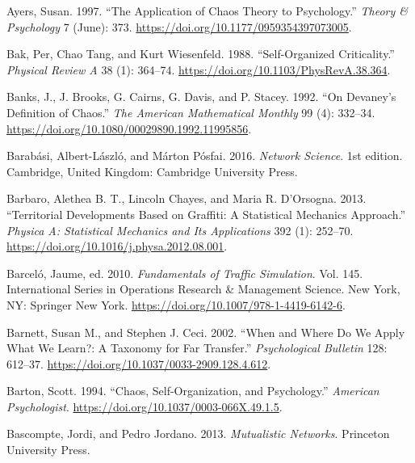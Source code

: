 \documentclass[
  a4paper,
  DIV=11,
  numbers=noendperiod]{scrreprt}
\newlength{\cslhangindent}
\newlength{\cslentryspacingunit} %
\newenvironment{CSLReferences}[2] %
 {%
  \setlength{\parindent}{0pt}
  \ifodd #1
  \let\oldpar\par
  \def\par{\hangindent=\cslhangindent\oldpar}
  \fi
  \setlength{\parskip}{#2\cslentryspacingunit}
 }%
 {}
\begin{document}
\begin{CSLReferences}{1}{0}
\leavevmode{}%
Ayers, Susan. 1997. {``The {Application} of {Chaos Theory} to
{Psychology}.''} \emph{Theory \& Psychology} 7 (June): 373.
\url{https://doi.org/10.1177/0959354397073005}.

\leavevmode{}%
Bak, Per, Chao Tang, and Kurt Wiesenfeld. 1988. {``Self-Organized
Criticality.''} \emph{Physical Review A} 38 (1): 364--74.
\url{https://doi.org/10.1103/PhysRevA.38.364}.

\leavevmode{}%
Banks, J., J. Brooks, G. Cairns, G. Davis, and P. Stacey. 1992. {``On
{Devaney}'s {Definition} of {Chaos}.''} \emph{The American Mathematical
Monthly} 99 (4): 332--34.
\url{https://doi.org/10.1080/00029890.1992.11995856}.

\leavevmode{}%
Barabási, Albert-László, and Márton Pósfai. 2016. \emph{Network
{Science}}. 1st edition. {Cambridge, United Kingdom}: {Cambridge
University Press}.

\leavevmode{}%
Barbaro, Alethea B. T., Lincoln Chayes, and Maria R. D'Orsogna. 2013.
{``Territorial Developments Based on Graffiti: {A} Statistical Mechanics
Approach.''} \emph{Physica A: Statistical Mechanics and Its
Applications} 392 (1): 252--70.
\url{https://doi.org/10.1016/j.physa.2012.08.001}.

\leavevmode{}%
Barceló, Jaume, ed. 2010. \emph{Fundamentals of {Traffic Simulation}}.
Vol. 145. International {Series} in {Operations Research} \& {Management
Science}. {New York, NY}: {Springer New York}.
\url{https://doi.org/10.1007/978-1-4419-6142-6}.

\leavevmode{}%
Barnett, Susan M., and Stephen J. Ceci. 2002. {``When and Where Do We
Apply What We Learn?: {A} Taxonomy for Far Transfer.''}
\emph{Psychological Bulletin} 128: 612--37.
\url{https://doi.org/10.1037/0033-2909.128.4.612}.

\leavevmode{}%
Barton, Scott. 1994. {``Chaos, {Self-Organization}, and {Psychology}.''}
\emph{American Psychologist}.
\url{https://doi.org/10.1037/0003-066X.49.1.5}.

\leavevmode{}%
Bascompte, Jordi, and Pedro Jordano. 2013. \emph{Mutualistic
{Networks}}. {Princeton University Press}.


\end{CSLReferences}
\end{document}

